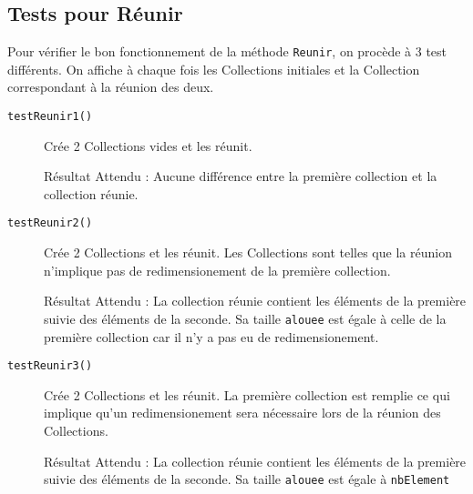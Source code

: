 \documentclass[11pt]{article}
\begin{document}
\subsection{Tests pour Réunir}
Pour vérifier le bon fonctionnement de la méthode \texttt{Reunir}, on procède à 3 test différents. On affiche à chaque fois les Collections initiales et la Collection correspondant à la réunion des deux.

\begin{description}
	\item[\texttt{testReunir1()}] Crée 2 Collections vides et les réunit.
	
	Résultat Attendu : Aucune différence entre la première collection et la collection réunie.
	
	\item[\texttt{testReunir2()}] Crée 2 Collections et les réunit. Les Collections sont telles que la réunion n'implique pas de redimensionement de la première collection.
	
	Résultat Attendu : La collection réunie contient les éléments de la première suivie des éléments de la seconde. Sa taille \texttt{alouee} est égale à celle de la première collection car il n'y a pas eu de redimensionement.
	
	\item[\texttt{testReunir3()}] Crée 2 Collections et les réunit. La première collection est remplie ce qui implique qu'un redimensionement sera nécessaire lors de la réunion des Collections.
	
	Résultat Attendu : La collection réunie contient les éléments de la première suivie des éléments de la seconde. Sa taille \texttt{alouee} est égale à \texttt{nbElement}
 
\end{description} 
\end{document}

